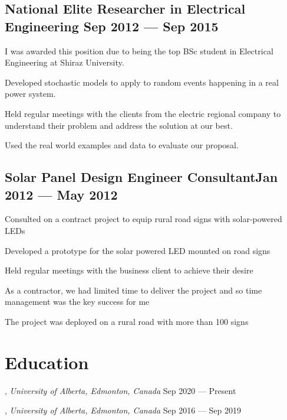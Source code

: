 \documentclass[letter,11pt]{article}
\begin{document}
\subsection{National Elite Researcher in Electrical Engineering \hfill Sep 2012 --- Sep 2015}
\begin{zitemize}
	\item I was awarded this position due to being the top BSc student in Electrical Engineering at Shiraz University.
	\item Developed stochastic models to apply to random events happening in a real power system.
	\item Held regular meetings with the clients from the electric regional company to understand their problem and address the solution at our best.
	\item Used the real world examples and data to evaluate our proposal.
\end{zitemize}


\subsection{Solar Panel Design Engineer Consultant\hfill Jan 2012 --- May 2012}
\begin{zitemize}
	\item Consulted on a contract project to equip rural road signs with solar-powered LEDs
	\item Developed a prototype for the solar powered LED mounted on road signs
	\item Held regular meetings with the business client to achieve their desire
	\item As a contractor, we had limited time to deliver the project and so time management was the key success for me
	\item The project was deployed on a rural road with more than 100 signs
\end{zitemize}


\section{Education}
, \textit{University of Alberta, Edmonton, Canada}	\hfill Sep 2020 ---  Present

, \textit{University of Alberta, Edmonton, Canada}	\hfill Sep 2016 ---  Sep 2019
\end{document}
